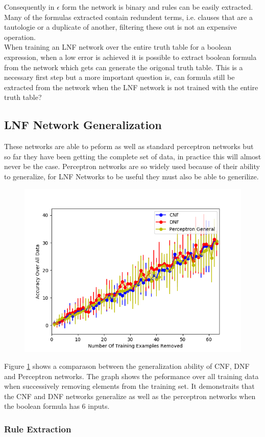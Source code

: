 Consequently in $\epsilon$ form the network is binary and rules can be easily extracted. Many of the formulas extracted contain redundent terms, i.e. clauses that are a tautologie or a duplicate of another, filtering these out is not an expensive operation.\\

When training an LNF network over the entire truth table for a boolean expression, when a low error is achieved it is possible to extract boolean formula from the network which gets can generate the origonal truth table. This is a necessary first step but a more important question is, can formula still be extracted from the network when the LNF network is not trained with the entire truth table?

\subsection{LNF Network Generalization}
These networks are able to peform as well as standard perceptron networks but so far they have been getting the complete set of data, in practice this will almost never be the case. Perceptron networks are so widely used because of their ability to generalize, for LNF Networks to be useful they must also be able to generilize.

\begin{figure}[H]
  \centering
  \begin{minipage}[b]{0.8\textwidth}
    \includegraphics[width=\textwidth]{6-generalization.png}
    \caption{}
  \end{minipage}
 \label{fig:generalization-peformance-6}
  \hfill
\end{figure}

Figure \ref{fig:generalization-peformance-6} shows a comparason between the generalization ability of CNF, DNF and Perceptron networks. The graph shows the peformance over all training data when successively removing elements from the training set. It demonstraits that the CNF and DNF networks generalize as well as the perceptron networks when the boolean formula has 6 inputs.

\subsubsection{Rule Extraction}
